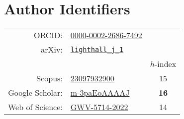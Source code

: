 \section*{Author Identifiers}
\begin{tabular}{r@{ }lc}
ORCID:&\href{https://orcid.org/0000-0002-2686-7492}{0000-0002-2686-7492}\\
arXiv:&\href{https://arxiv.org/a/lighthall_j_1.html}{\texttt{lighthall\_j\_1}}\\
&&$h$-index\\
Scopus:&\href{https://www.scopus.com/authid/detail.uri?authorId=23097932900}{23097932900}&15\\
Google Scholar:&\href{https://scholar.google.com/citations?user=m-3paEoAAAAJ}{m-3paEoAAAAJ}&\textbf{16}\\
Web of Science:&\href{https://www.webofscience.com/wos/author/record/GWV-5714-2022}{GWV-5714-2022}&14\\
\end{tabular}
{}
{}

{}
